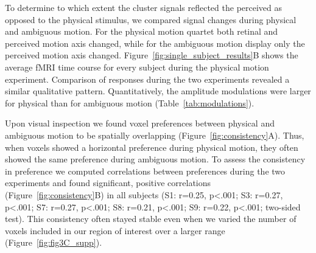 To determine to which extent the cluster signals reflected the perceived as opposed to the physical stimulus, we compared signal changes during physical and ambiguous motion. For the physical motion quartet both retinal and perceived motion axis changed, while for the ambiguous motion display only the perceived motion axis changed. Figure~\ref{fig:single_subject_results}B shows the average fMRI time course for every subject during the physical motion experiment. Comparison of responses during the two experiments revealed a similar qualitative pattern. Quantitatively, the amplitude modulations were larger for physical than for ambiguous motion (Table~\ref{tab:modulations}).

Upon visual inspection we found voxel preferences between physical and ambiguous motion to be spatially overlapping (Figure~\ref{fig:consistency}A). Thus, when voxels showed a horizontal preference during physical motion, they often showed the same preference during ambiguous motion. To assess the consistency in preference we computed correlations between preferences during the two experiments and found significant, positive correlations (Figure~\ref{fig:consistency}B) in all subjects (S1: r=0.25, p\textless.001; S3: r=0.27, p\textless.001; S7: r=0.27, p\textless.001; S8: r=0.21, p\textless.001; S9: r=0.22, p\textless.001; two-sided test). This consistency often stayed stable even when we varied the number of voxels included in our region of interest over a larger range (Figure~\ref{fig:fig3C_supp}).

